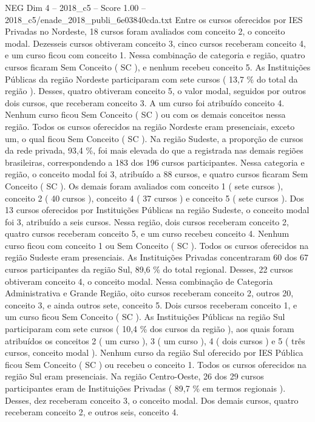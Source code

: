 \begin{textsample}{NEG Dim 4 – 2018\_c5 – Score 1.00 – 2018\_c5/enade\_2018\_publi\_6e03840cda.txt}
Entre os cursos oferecidos por IES Privadas no Nordeste, 18 cursos foram avaliados com conceito 2, o conceito modal.
Dezesseis cursos obtiveram conceito 3, cinco cursos receberam conceito 4, e um curso ficou com conceito 1.
Nessa combinação de categoria e região, quatro cursos ficaram Sem Conceito ( SC ), e nenhum recebeu conceito 5.
As Instituições Públicas da região Nordeste participaram com sete cursos ( 13,7 \% do total da região ).
Desses, quatro obtiveram conceito 5, o valor modal, seguidos por outros dois cursos, que receberam conceito 3.
A um curso foi atribuído conceito 4.
Nenhum curso ficou Sem Conceito ( SC ) ou com os demais conceitos nessa região.
Todos os cursos oferecidos na região Nordeste eram presenciais, exceto um, o qual ficou Sem Conceito ( SC ).
Na região Sudeste, a proporção de cursos da rede privada, 93,4 \%, foi mais elevada do que a registrada nas demais regiões brasileiras, correspondendo a 183 dos 196 cursos participantes.
Nessa categoria e região, o conceito modal foi 3, atribuído a 88 cursos, e quatro cursos ficaram Sem Conceito ( SC ).
Os demais foram avaliados com conceito 1 ( sete cursos ), conceito 2 ( 40 cursos ), conceito 4 ( 37 cursos ) e conceito 5 ( sete cursos ).
Dos 13 cursos oferecidos por Instituições Públicas na região Sudeste, o conceito modal foi 3, atribuído a seis cursos.
Nessa região, dois cursos receberam conceito 2, quatro cursos receberam conceito 5, e um curso recebeu conceito 4.
Nenhum curso ficou com conceito 1 ou Sem Conceito ( SC ).
Todos os cursos oferecidos na região Sudeste eram presenciais.
As Instituições Privadas concentraram 60 dos 67 cursos participantes da região Sul, 89,6 \% do total regional.
Desses, 22 cursos obtiveram conceito 4, o conceito modal.
Nessa combinação de Categoria Administrativa e Grande Região, oito cursos receberam conceito 2, outros 20, conceito 3, e ainda outros sete, conceito 5.
Dois cursos receberam conceito 1, e um curso ficou Sem Conceito ( SC ).
As Instituições Públicas na região Sul participaram com sete cursos ( 10,4 \% dos cursos da região ), aos quais foram atribuídos os conceitos 2 ( um curso ), 3 ( um curso ), 4 ( dois cursos ) e 5 ( três cursos, conceito modal ).
Nenhum curso da região Sul oferecido por IES Pública ficou Sem Conceito ( SC ) ou recebeu o conceito 1.
Todos os cursos oferecidos na região Sul eram presenciais.
Na região Centro-Oeste, 26 dos 29 cursos participantes eram de Instituições Privadas ( 89,7 \% em termos regionais ).
Desses, dez receberam conceito 3, o conceito modal.
Dos demais cursos, quatro receberam conceito 2, e outros seis, conceito 4.

\end{textsample}

